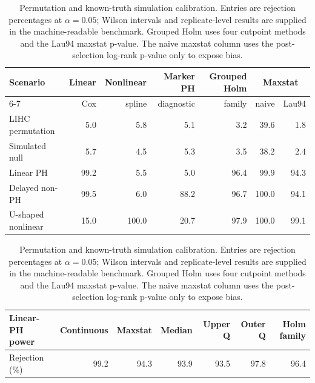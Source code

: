\begin{table}[H]
\centering
\begingroup
{}
\scriptsize
\renewcommand{\arraystretch}{1.05}
\caption{Permutation and known-truth simulation calibration. Entries are rejection percentages at $\alpha=0.05$; Wilson intervals and replicate-level results are supplied in the machine-readable benchmark. Grouped Holm uses four cutpoint methods and the Lau94 maxstat p-value. The naive maxstat column uses the post-selection log-rank p-value only to expose bias.}
\label{tab:statistical-calibration}
\begin{tabular}{lrrrrrr}
\toprule
Scenario & Linear & Nonlinear & Marker PH & Grouped Holm & \multicolumn{2}{c}{Maxstat} \\
\cmidrule(lr){6-7}
 & Cox & spline & diagnostic & family & naive & Lau94 \\
\midrule
LIHC permutation & 5.0 & 5.8 & 5.1 & 3.2 & 39.6 & 1.8 \\
Simulated null & 5.7 & 4.5 & 5.3 & 3.5 & 38.2 & 2.4 \\
Linear PH & 99.2 & 5.5 & 5.0 & 96.4 & 99.9 & 94.3 \\
Delayed non-PH & 99.5 & 6.0 & 88.2 & 96.7 & 100.0 & 94.1 \\
U-shaped nonlinear & 15.0 & 100.0 & 20.7 & 97.9 & 100.0 & 99.1 \\
\bottomrule
\end{tabular}
\par\vspace{4pt}
\begin{tabular}{lrrrrrr}
\toprule
Linear-PH power & Continuous & Maxstat & Median & Upper Q & Outer Q & Holm family \\
\midrule
Rejection (\%) & 99.2 & 94.3 & 93.9 & 93.5 & 97.8 & 96.4 \\
\bottomrule
\end{tabular}
\endgroup
\end{table}
